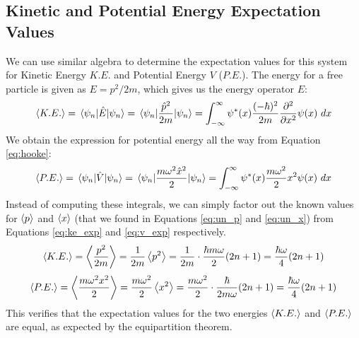 \documentclass[a4paper]{article}
\begin{document}
\subsection{Kinetic and Potential Energy Expectation Values}
We can use similar algebra to determine the expectation values for this system for Kinetic Energy $K.E.$ and Potential Energy $V$ ($P.E.$). The energy for a free particle is given as $E=p^2/2m$, which gives us the energy operator $E$:
\begin{equation} \label{eq:ke_exp}
\expval{K.E.} = \mel{\psi_n}{\hat E}{\psi_n} = \mel{\psi_n}{\frac{\hat p^2}{2m}}{\psi_n} = \int^\infty_{-\infty}\psi^*(x)\frac{(-\hbar)^2}{2m}\frac{\partial^2}{\partial x^2}\psi(x)\ dx
\end{equation}
We obtain the expression for potential energy all the way from Equation \ref{eq:hooke}:
\begin{equation} \label{eq:v_exp}
\expval{P.E.}=\mel{\psi_n}{\hat V}{\psi_n}=\mel{\psi_n}{\frac{m\omega^2\hat x^2}2}{\psi_n}=\int^\infty_{-\infty}\psi^*(x)\frac{m\omega^2}2x^2\psi(x)\ dx
\end{equation}
Instead of computing these integrals, we can simply factor out the known values for $\expval p$ and $\expval x$ (that we found in Equations \ref{eq:un_p} and \ref{eq:un_x}) from Equations \ref{eq:ke_exp} and \ref{eq:v_exp} respectively.
\begin{equation} \label{eq:ke_exp}
\expval{K.E.}=\expval{\frac{p^2}{2m}}=\frac1{2m}\expval{p^2}=\frac1{2m}\cdot\frac{\hbar m\omega}2(2n+1)=\frac{\hbar \omega}4(2n+1)
\end{equation}
\begin{equation} \label{eq:pe_exp}
\expval{P.E.}=\expval{\frac{m\omega^2x^2}2}=\frac{m\omega^2}2\expval{x^2}=\frac{m\omega^2}2\cdot\frac\hbar{2m\omega}(2n+1)=\frac{\hbar \omega}4(2n+1)
\end{equation}
This verifies that the expectation values for the two energies $\expval{K.E.}$ and $\expval{P.E.}$ are equal, as expected by the equipartition theorem.
\end{document}
